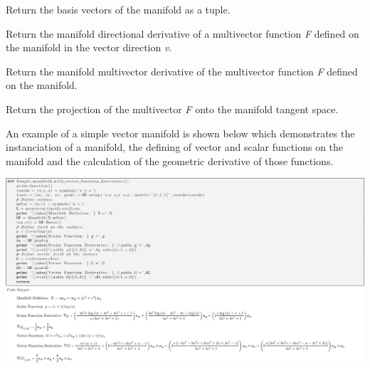 \documentclass[letterpaper,10pt,english]{sphinxmanual}
\begin{document}

\begin{fulllineitems}
\label{GA:Basis}
Return the basis vectors of the manifold as a tuple.

\end{fulllineitems}


\begin{fulllineitems}
Return the manifold directional derivative of a multivector function \emph{F} defined on the manifold in the vector direction \emph{v}.

\end{fulllineitems}


\begin{fulllineitems}
\label{GA:Grad}
Return the manifold multivector derivative of the multivector function \emph{F} defined on the manifold.

\end{fulllineitems}


\begin{fulllineitems}
\label{GA:Proj}
Return the projection of the multivector \emph{F} onto the manifold tangent space.

\end{fulllineitems}


An example of a simple vector manifold is shown below which demonstrates the instanciation of a manifold, the defining
of vector and scalar functions on the manifold and the calculation of the geometric derivative of those functions.

\includegraphics{manifold_test.png}
\end{document}
